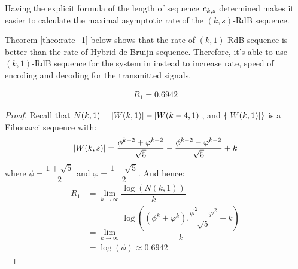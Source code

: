 Having the explicit formula of the length of sequence ${\boldsymbol c}_{k,s}$ determined makes it easier to calculate the maximal asymptotic rate of the $(k,s)$-RdB sequence.

Theorem \ref{theo:rate_1} below shows that the rate of $(k,1)$-RdB sequence is better than the rate of Hybrid de Bruijn sequence. Therefore, it's able to use $(k,1)$-RdB sequence for the system in \cite{zhang2021timing} instead to increase rate, speed of encoding and decoding for the transmitted signals.

\begin{theorem}\label{theo:rate_1}
    \begin{align}
        R_{1} = 0.6942
    \end{align}
\end{theorem}
\begin{proof}
    Recall that $N(k,1) = \left \lvert W(k,1) \right \rvert - \left \lvert W(k-4,1) \right \rvert$, and $\{\left \lvert W(k,1) \right \rvert\}$ is a Fibonacci sequence with: 
    \[\left \lvert W(k,s) \right \rvert = \dfrac{\phi^{k+2}+\varphi^{k+2}}{\sqrt{5}}-\dfrac{\phi^{k-2}-\varphi^{k-2}}{\sqrt{5}} + k\]
    where $\phi = \dfrac{1+\sqrt{5}}{2}$ and $\varphi = \dfrac{1-\sqrt{5}}{2}$.
    And hence:
    \begin{align*}
        R_{1} &= \lim_{k\to\infty}\dfrac{\log(N(k,1))}{k} \\
        &= \lim_{k\to\infty}\dfrac{ \log\left( \left(\phi^{k}+\varphi^{k}\right).\dfrac{\phi^{2}-\varphi^{2}}{\sqrt{5}}+k \right) }{k} \\
        &= \log(\phi) \approx 0.6942
    \end{align*}
\end{proof}

